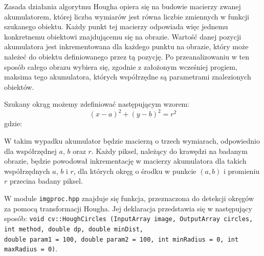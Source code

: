 Zasada działania algorytmu Hougha opiera się na budowie macierzy zwanej akumulatorem, której liczba wymiarów jest równa liczbie zmiennych w funkcji szukanego obiektu. Każdy punkt tej macierzy odpowiada więc jednemu konkretnemu obiektowi znajdującemu się na obrazie. Wartość danej pozycji akumulatora jest inkrementowana dla każdego punktu na obrazie, który może należeć do obiektu definiowanego przez tą pozycję. Po przeanalizowaniu w ten sposób całego obrazu wybiera się, zgodnie z założonym wcześniej progiem, maksima tego akumulatora, których współrzędne są parametrami znalezionych obiektów\cite{Sonka}.

Szukany okrąg możemy zdefiniować następującym wzorem:
\begin{equation}
(x - a)^2 + (y - b)^2 = r^2
\label{eq:kolo}
\end{equation}
gdzie:
\begin{equationDescriptor}
\end{equationDescriptor}
W takim wypadku akumulator będzie macierzą o trzech wymiarach, odpowiednio dla współrzędnej $a$, $b$ oraz $r$. Każdy piksel, należący do krawędzi na badanym obrazie, będzie powodował inkrementację w macierzy akumulatora dla takich współrzędnych $a$, $b$ i $r$, dla których okręg o środku w punkcie $(a, b)$ i promieniu $r$ przecina badany piksel.

W module \texttt{imgproc.hpp} znajduje się funkcja, przeznaczona do detekcji okręgów za pomocą transformacji Hougha. Jej deklaracja przedstawia się w następujący sposób: \texttt{void cv::HoughCircles (InputArray image, OutputArray circles, int method, double dp, double minDist, \\double param1 = 100, double param2 = 100, int minRadius = 0, int maxRadius = 0)}.

